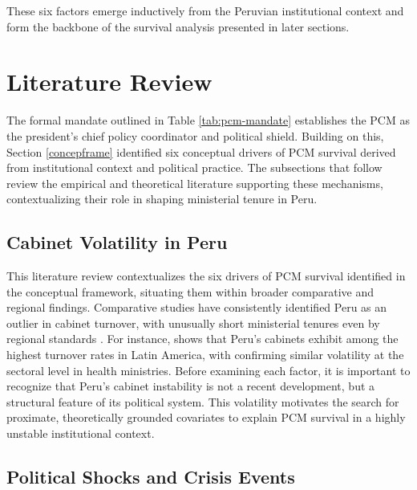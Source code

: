 \documentclass[a4paper, 12pt]{article}
\begin{document}
These six factors emerge inductively from the Peruvian institutional context and form the backbone of the survival analysis presented in later sections.



\section{Literature Review}\label{sec:letrev}

The formal mandate outlined in Table \ref{tab:pcm-mandate} establishes the PCM as the president’s chief policy coordinator and political shield. Building on this, Section \ref{concepframe} identified six conceptual drivers of PCM survival derived from institutional context and political practice. The subsections that follow review the empirical and theoretical literature supporting these mechanisms, contextualizing their role in shaping ministerial tenure in Peru.


\subsection{Cabinet Volatility in Peru}


This literature review contextualizes the six drivers of PCM survival identified in the conceptual framework, situating them within broader comparative and regional findings. Comparative studies have consistently identified Peru as an outlier in cabinet turnover, with unusually short ministerial tenures even by regional standards \citep{martinez-gallardo_out_2012, gozzer_duracion_2021}. For instance, \citet{martinez-gallardo_out_2012} shows that Peru's cabinets exhibit among the highest turnover rates in Latin America, with \citet{gozzer_duracion_2021} confirming similar volatility at the sectoral level in health ministries. Before examining each factor, it is important to recognize that Peru's cabinet instability is not a recent development, but a structural feature of its political system. This volatility motivates the search for proximate, theoretically grounded covariates to explain PCM survival in a highly unstable institutional context.


\subsection{Political Shocks and Crisis Events}
\end{document}
